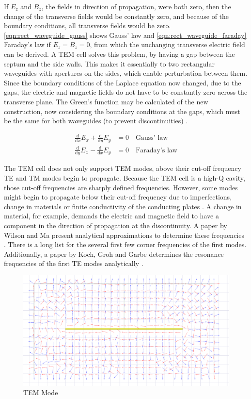 If $E_z$ and $B_z$, the fields in direction of propagation, were both zero, then the change of the transverse fields would be constantly zero, and because of the boundary conditions, all transverse fields would be zero. \autoref{eqn:rect_waveguide_gauss} shows Gauss' law and \autoref{eqn:rect_waveguide_faraday} Faraday's law if $E_z=B_z=0$, from which the unchanging transverse electric field can be derived. A TEM cell solves this problem, by having a gap between the septum and the side walls. This makes it essentially to two rectangular waveguides with apertures on the sides, which enable perturbation between them. Since the boundary conditions of the Laplace equation now changed, due to the gaps, the electric and magnetic fields do not have to be constantly zero across the transverse plane. The Green's function may be calculated of the new construction, now considering the boundary conditions at the gaps, which must be the same for both waveguides (to prevent discontinuities) \cite{Tippet_Chang_Crawford_1976}.

\begin{align}
    \frac{\mathrm{d}}{\mathrm{d}x}E_x+\frac{\mathrm{d}}{\mathrm{d}y}E_y&=0\quad\text{Gauss' law}\label{eqn:rect_waveguide_gauss}\\
    \frac{\mathrm{d}}{\mathrm{d}y}E_x-\frac{\mathrm{d}}{\mathrm{d}x}E_y&=0\quad\text{Faraday's law}\label{eqn:rect_waveguide_faraday}
\end{align}


The TEM cell does not only support TEM modes, above their cut-off frequency TE and TM modes begin to propagate. Because the TEM cell is a high-Q cavity, those cut-off frequencies are sharply defined frequencies. However, some modes might begin to propagate below their cut-off frequency due to imperfections, change in materials or finite conductivity of the conducting plates \cite{10791592}. A change in material, for example, demands the electric and magnetic field to have a component in the direction of propagation at the discontinuity. A paper by Wilson and Ma present analytical approximations to determine these frequencies \cite{Wilson_Ma_1986}.  There is a long list for the several first few corner frequencies of the first modes. Additionally, a paper by Koch, Groh and Garbe determines the resonance frequencies of the first TE modes analytically \cite{10791592}.

\begin{figure}[h]
    \centering
    \includegraphics[width=0.5\linewidth]{images/tem_mode.png}
    \caption{TEM Mode}
    \label{fig:tem_mode}
\end{figure}

